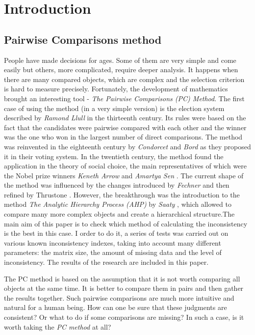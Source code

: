 \chapter{Introduction}
\label{cha:wprowadzenie}

\section{Pairwise Comparisons method}
\label{sec:metodaPorowan}
People have made decisions for ages. Some of them are very simple and come easily but others, more complicated, require deeper analysis. It happens when there are many compared objects, which are complex and the selection criterion is hard to measure precisely. Fortunately, the development of mathematics brought an interesting tool - \textit{The Pairwise Comparisons (PC) Method}. The first case of using the method (in a very simple version) is the election system described by \textit{Ramond Llull} \cite{Colomer2013} in the thirteenth century. Its rules were based on the fact that the candidates were pairwise compared with each other and the winner was the one who won in the largest number of direct comparisons. The method was reinvented in the eighteenth century by \textit{Condorcet} and \textit{Bord} \cite{Kulakowski2016} as they proposed it in their voting system. In the twentieth century, the method found the application in the theory of social choice, the main representatives of which were the Nobel prize winners \textit{Keneth Arrow} \cite{Arrow} and \textit{Amartya Sen} \cite{Sen}. The current shape of the method was influenced by the changes introduced by \textit{Fechner} and then refined by {Thrustone} \cite{Thurstone1994}. However, the breakthrough was the introduction to the method \textit\textit{The Analytic Hierarchy Process (AHP)} by \textit{Saaty} \cite{Saaty2008}, which allowed to compare many more complex objects and create a hierarchical structure.The main aim of this paper is to check which method of calculating the inconsistency is the best in this case. I order to do it, a series of tests was carried out on various known inconsistency indexes, taking into account many different parameters: the matrix size, the amount of missing data and the level of inconsistency. The results of the research are included in this paper.

The PC method is based on the assumption that it is not worth comparing all objects at the same time. It is better to compare them in pairs and then gather the results together. Such pairwise comparisons are much more intuitive and natural for a human being. How can one be sure that these judgments are consistent? Or what to do if some comparisons are missing? In such a case, is it worth taking the \textit{PC method} at all?

